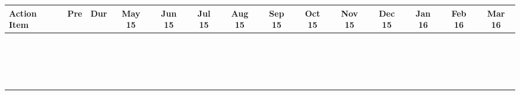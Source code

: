 \documentclass[10pt,a4paper,headsepline,smallheadings]{scrartcl}
\theoremstyle{definition}
\begin{document}
\begin{landscape}
\begin{center}
\begin{tabular}{l|c|c|c|c|c|c|c|c|c|c|c|c|c}
Action Item \hspace{1cm} & Pre & Dur & May 15 & Jun 15 & Jul 15 & Aug 15 & Sep 15 & Oct 15 & Nov 15 & Dec 15 & Jan 16 & Feb 16 & Mar 16\\ \hline 
& & & & & & & & & & & & &\\[10pt] \hline 
& & & & & & & & & & & & &\\[10pt] \hline 
& & & & & & & & & & & & &\\[10pt] \hline 
& & & & & & & & & & & & &\\[10pt] \hline 
& & & & & & & & & & & & &\\[10pt] \hline 
& & & & & & & & & & & & &\\[10pt] \hline 
& & & & & & & & & & & & &\\[10pt] \hline 
& & & & & & & & & & & & &\\[10pt] \hline 
& & & & & & & & & & & & &\\[10pt] \hline 
& & & & & & & & & & & & &\\[10pt] \hline 
& & & & & & & & & & & & &\\[10pt] \hline 
& & & & & & & & & & & & &\\[10pt] \hline 
& & & & & & & & & & & & &\\[10pt] \hline 
& & & & & & & & & & & & &\\[10pt] \hline 
& & & & & & & & & & & & &\\[10pt] \hline 
& & & & & & & & & & & & &\\[10pt] \hline 
& & & & & & & & & & & & &\\[10pt] \hline 
& & & & & & & & & & & & &\\[10pt] 
\end{tabular}
\end{center}
\end{landscape}
\end{document}
